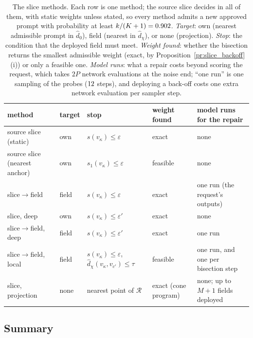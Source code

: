 \documentclass{article}
\theoremstyle{plain}
\theoremstyle{remark}
\begin{document}
\begin{table}[!htbp]
\centering
\caption{The slice methods. Each row is one method; the source slice decides in all of them, with static weights unless stated, so
every method admits a new approved prompt with probability at least $k/(K+1)=0.902$. \emph{Target}: own (nearest admissible prompt
in $\hat d_0$), field (nearest in $\hat d_\chi$), or none (projection). \emph{Stop}: the condition that the deployed field must meet.
\emph{Weight found}: whether the bisection returns the smallest admissible weight (exact, by Proposition~\ref{pr:slice_backoff}(i)) or
only a feasible one. \emph{Model runs}: what a repair costs beyond scoring the request, which takes $2P$ network evaluations at the
noise end; ``one run'' is one sampling of the probes ($12$ steps), and deploying a back-off costs one extra network evaluation per
sampler step.}
\label{tab:e3c_slice}
\small
\setlength{\tabcolsep}{3.4pt}
\begin{tabular}{l l l l l}
\toprule
method & target & stop & weight found & model runs for the repair\\
\midrule
source slice (static) & own & $s(v_\kappa)\le\varepsilon$ & exact & none\\
source slice (nearest anchor) & own & $s_1(v_\kappa)\le\varepsilon$ & feasible & none\\
slice$\to$field & field & $s(v_\kappa)\le\varepsilon$ & exact & one run (the request's outputs)\\
slice, deep & own & $s(v_\kappa)\le\varepsilon'$ & exact & none\\
slice$\to$field, deep & field & $s(v_\kappa)\le\varepsilon'$ & exact & one run\\
slice$\to$field, local & field & $s(v_\kappa)\le\varepsilon$, $\hat d_\chi(v_\kappa,v_{c'})\le\tau$ & feasible & one run, and one per bisection step\\
slice, projection & none & nearest point of $\mathcal R$ & exact (cone program) & none; up to $M+1$ fields deployed\\
\bottomrule
\end{tabular}
\end{table}
\FloatBarrier

\subsection{Summary}\label{sec:e3_summary}
\end{document}
